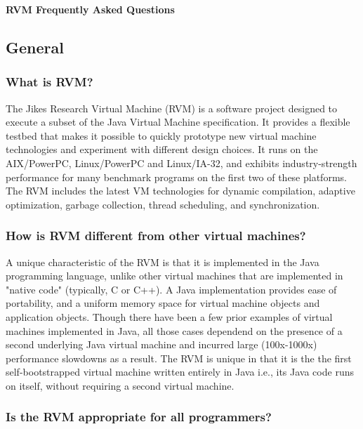 \begin{center}
{\bf RVM Frequently Asked Questions}
\end{center}

\subsection{General}

\subsubsection{What is RVM?}

The Jikes Research Virtual Machine (RVM) is a software project designed to 
execute a subset of the Java Virtual Machine specification.  It provides a
flexible testbed that makes it possible to quickly prototype new
virtual machine technologies and experiment with different design
choices.  It runs on the AIX/PowerPC, Linux/PowerPC and Linux/IA-32,
and exhibits industry-strength performance for many benchmark programs
on the first two of these platforms.  The RVM includes the latest VM
technologies for dynamic compilation, adaptive optimization, garbage
collection, thread scheduling, and synchronization.

\subsubsection{How is RVM different from other virtual machines?}

A unique characteristic of the RVM is that it is implemented in the
Java programming language, unlike other virtual machines that are
implemented in "native code" (typically, C or C++).  A Java
implementation provides ease of portability, and a uniform memory
space for virtual machine objects and application objects.  Though
there have been a few prior examples of virtual machines implemented
in Java, all those cases dependend on the presence of a second
underlying Java virtual machine and incurred large (100x-1000x)
performance slowdowns as a result.  
The RVM is unique in that it is
the the first self-bootstrapped virtual machine written entirely in
Java i.e., its Java code runs on itself, without requiring a second
virtual machine.

\subsubsection{Is the RVM appropriate for all programmers?}

